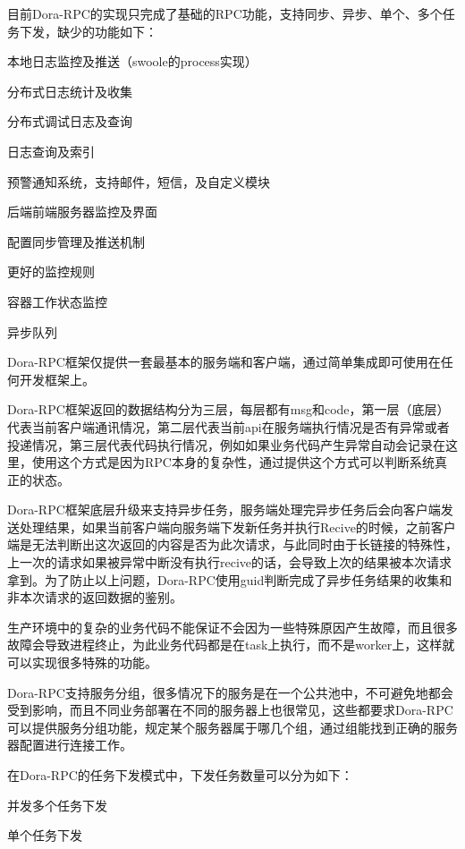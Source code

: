 目前Dora-RPC的实现只完成了基础的RPC功能，支持同步、异步、单个、多个任务下发，缺少的功能如下：

\begin{compactitem}
\item 本地日志监控及推送（swoole的process实现）
\item 分布式日志统计及收集
\item 分布式调试日志及查询
\item 日志查询及索引
\item 预警通知系统，支持邮件，短信，及自定义模块
\item 后端前端服务器监控及界面
\item 配置同步管理及推送机制
\item 更好的监控规则
\item 容器工作状态监控
\item 异步队列
\end{compactitem}

Dora-RPC框架仅提供一套最基本的服务端和客户端，通过简单集成即可使用在任何开发框架上。


Dora-RPC框架返回的数据结构分为三层，每层都有msg和code，第一层（底层）代表当前客户端通讯情况，第二层代表当前api在服务端执行情况是否有异常或者投递情况，第三层代表代码执行情况，例如如果业务代码产生异常自动会记录在这里，使用这个方式是因为RPC本身的复杂性，通过提供这个方式可以判断系统真正的状态。

Dora-RPC框架底层升级来支持异步任务，服务端处理完异步任务后会向客户端发送处理结果，如果当前客户端向服务端下发新任务并执行Recive的时候，之前客户端是无法判断出这次返回的内容是否为此次请求，与此同时由于长链接的特殊性，上一次的请求如果被异常中断没有执行recive的话，会导致上次的结果被本次请求拿到。为了防止以上问题，Dora-RPC使用guid判断完成了异步任务结果的收集和非本次请求的返回数据的鉴别。

生产环境中的复杂的业务代码不能保证不会因为一些特殊原因产生故障，而且很多故障会导致进程终止，为此业务代码都是在task上执行，而不是worker上，这样就可以实现很多特殊的功能。

Dora-RPC支持服务分组，很多情况下的服务是在一个公共池中，不可避免地都会受到影响，而且不同业务部署在不同的服务器上也很常见，这些都要求Dora-RPC可以提供服务分组功能，规定某个服务器属于哪几个组，通过组能找到正确的服务器配置进行连接工作。



在Dora-RPC的任务下发模式中，下发任务数量可以分为如下：

\begin{compactitem}
\item 并发多个任务下发
\item 单个任务下发
\end{compactitem}

